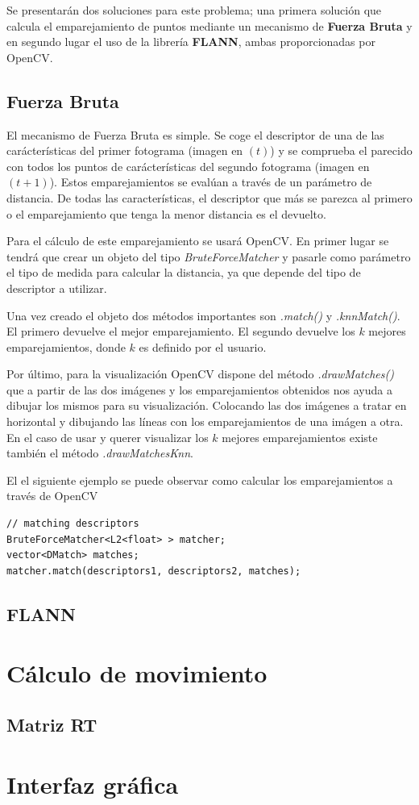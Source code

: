 Se presentarán dos soluciones para este problema; una primera solución que calcula el emparejamiento de puntos mediante un mecanismo de \textbf{Fuerza Bruta} y en segundo lugar el uso de la librería \textbf{FLANN}, ambas proporcionadas por OpenCV.

\subsection{Fuerza Bruta}

El mecanismo de Fuerza Bruta es simple. Se coge el descriptor de una de las carácterísticas del primer fotograma (imagen en $(t)$) y se comprueba el parecido con todos los puntos de carácterísticas del segundo fotograma (imagen en $(t+1)$). Estos emparejamientos se evalúan a través de un parámetro de distancia. De todas las características, el descriptor que más se parezca al primero o el emparejamiento que tenga la menor distancia es el devuelto.

Para el cálculo de este emparejamiento se usará OpenCV. En primer lugar se tendrá que crear un objeto del tipo \textit{BruteForceMatcher} y pasarle como parámetro el tipo de medida para calcular la distancia, ya que depende del tipo de descriptor a utilizar.

Una vez creado el objeto dos métodos importantes son \textit{.match()} y \textit{.knnMatch()}. El primero devuelve el mejor emparejamiento. El segundo devuelve los $k$ mejores emparejamientos, donde $k$ es definido por el usuario.

Por último, para la visualización OpenCV dispone del método \textit{.drawMatches()} que a partir de las dos imágenes y los emparejamientos obtenidos nos ayuda a dibujar los mismos para su visualización. Colocando las dos imágenes a tratar en horizontal y dibujando las líneas con los emparejamientos de una imágen a otra. En el caso de usar y querer visualizar los $k$ mejores emparejamientos existe también el método \textit{.drawMatchesKnn}.

El el siguiente ejemplo se puede observar como calcular los emparejamientos a través de OpenCV

\begin{lstlisting}[style=CStyle]
// matching descriptors
BruteForceMatcher<L2<float> > matcher;
vector<DMatch> matches;
matcher.match(descriptors1, descriptors2, matches);
\end{lstlisting}


\subsection{FLANN}

\section{Cálculo de movimiento}

\subsection{Matriz RT}

\section{Interfaz gráfica}